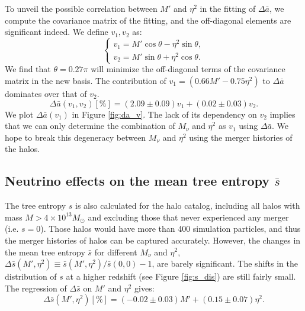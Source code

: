 To unveil the possible correlation between $M'$ and $\eta^2$ in the fitting of $\Delta \bar a$, we compute the covariance matrix of the fitting, and the off-diagonal elements are significant indeed. We define $v_1, v_2$ as:
\begin{equation}
\label{eq:rot}
    \begin{cases}
    v_1 = M'\cos \theta  - \eta^2 \sin \theta,  \\ 
    v_2 = M' \sin \theta  + \eta^2\cos \theta.
    \end{cases}
\end{equation}
We find that $\theta = 0.27\pi$ will minimize the off-diagonal terms of the covariance matrix in the new basis. The contribution of $v_1 = (0.66 M' - 0.75\eta^2)$ to $\Delta \bar a$ dominates over that of $v_2$.
\begin{equation}
\label{eq:reg_v1}
    \Delta \bar a(v_1, v_2) [\%] = (2.09\pm0.09) v_1 + (0.02\pm0.03) v_2.
\end{equation}
We plot $\Delta \bar a(v_1)$ in Figure \ref{fig:da_v}. The lack of its dependency on $v_2$ implies that we can only determine the combination of $M_\nu$ and $\eta^2$ as $v_1$ using $\Delta \bar a$. We hope to break this degeneracy between $M_\nu$ and $\eta^2$ using the merger histories of the halos.


\subsection{Neutrino effects on the mean tree entropy $\bar s$}
The tree entropy $s$ is also calculated for the halo catalog,
including all halos with mass $M>4\times10^{13} M_\odot$ and excluding those that never experienced any merger (i.e. $s=0$). Those halos would have more than 400 simulation particles, and thus the merger histories of halos can be captured accurately.
However, the changes in the mean tree entropy $\bar s$ for different $M_\nu$ and $\eta^2$, $\Delta {\bar s} (M', \eta^2) \equiv \bar s(M', \eta^2) / \bar s (0, 0)-1$, are barely significant. 
The shifts in the distribution of $s$ at a higher redshift (see Figure \ref{fig:s_dis}) are still fairly small.
The regression of $\Delta \bar s$ on $M'$ and $\eta^2$ gives:
\begin{equation}
    \Delta \bar s(M',\eta^2) [\%] = (-0.02\pm0.03) M' + (0.15\pm0.07) \eta^2.
\end{equation}

